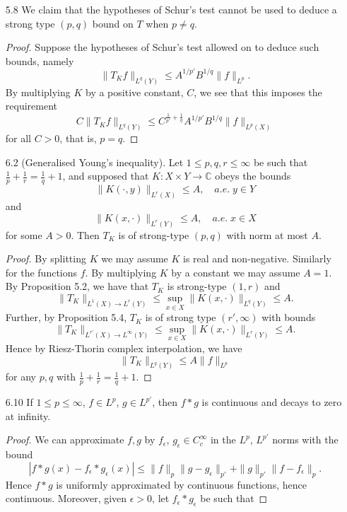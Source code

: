 \documentclass[11pt]{article}
\theoremstyle{remark}
\newcommand{\1}{\textbf{1}}
\def\norm#1{\| #1  \|}
\newcommand{\bbC}{\mathbb{C}}
\begin{document}
\begin{enumerate}
\begin{proof}
and by assumption $\lambda(y)$ and $H(x)^{p/q - 1}$ are in $L_x^{p/q}$ and $L_y^1$, respectively.
\end{proof}
\item[5.8] We claim that the hypotheses of Schur's test cannot be used to deduce a strong type $(p,q)$ bound on $T$ when $p \neq q$.
\begin{proof}
Suppose the hypotheses of Schur's test allowed on to deduce such bounds, namely
\[
\norm{T_K f}_{L^q(Y)} \leq A^{1/p'} B^{1/q} \norm{f}_{L^p}.
\]
By multiplying $K$ by a positive constant, $C$, we see that this imposes the requirement
\[
C \norm{T_K f}_{L^q(Y)} \leq C^{\frac{1}{p'} + \frac{1}{q}} A^{1/p'} B^{1/q} \norm{f}_{L^p(X)}
\]
for all $C > 0$, that is, $p = q$.
\end{proof}
\item[6.2] (Generalised Young's inequality). Let $1 \leq p,q,r \leq \infty$ be such that $\frac{1}{p} + \frac{1}{r} = \frac{1}{q} + 1$, and supposed that $K: X \times Y \to \bbC$ obeys the bounds
\[
\norm{K(\cdot,y)}_{L^r(X)} \leq A, \quad a.e.\; y \in Y
\]
and
\[
\norm{K(x,\cdot)}_{L^r(Y)} \leq A, \quad a.e.\; x \in X
\]
for some $A > 0$. Then $T_K$ is of strong-type $(p,q)$ with norm at most $A$.
\begin{proof}
By splitting $K$ we may assume $K$ is real and non-negative. Similarly for the functions $f$. By multiplying $K$ by a constant we may assume $A =1$. By Proposition 5.2, we have that $T_K$ is strong-type $(1,r)$ and
\[
\norm{T_K}_{L^1(X) \to L^r(Y)} \leq \sup_{x \in X} \norm{K(x, \cdot)}_{L^q(Y)} \leq A.
\]
Further, by Proposition 5.4, $T_K$ is of strong type $(r',\infty)$ with bounds
\[
\norm{T_K}_{L^{r'}(X) \to L^\infty(Y)} \leq \sup_{x \in X} \norm{K(x, \cdot)}_{L^r(Y)} \leq A.
\]
Hence by Riesz-Thorin complex interpolation, we have
\[
\norm{T_{K}}_{L^{q}(Y)} \leq A \norm{f}_{L^p}
\]
for any $p,q$ with $\frac{1}{p} + \frac{1}{r} = \frac{1}{q} + 1$.
\end{proof}
\item[6.10] If $1 \leq p \leq \infty$, $f \in L^p$, $g \in L^{p'}$, then $f*g$ is continuous and decays to zero at infinity.
\begin{proof}
We can approximate $f, g$ by $f_\epsilon$, $g_\epsilon \in C_c^\infty$ in the $L^p$, $L^{p'}$ norms with the bound
\[
|f * g (x) - f_\epsilon * g_ \epsilon (x)|  \leq \norm{f}_p \norm{  g - g_\epsilon }_{p'} + \norm{g}_{p'} \norm{f-f_\epsilon}_{p}.
\]
Hence $f*g$ is uniformly approximated by continuous functions, hence continuous. Moreover, given $\epsilon > 0$, let $f_\epsilon * g_\epsilon$ be such that

\end{proof}
\end{enumerate}
\end{document}
